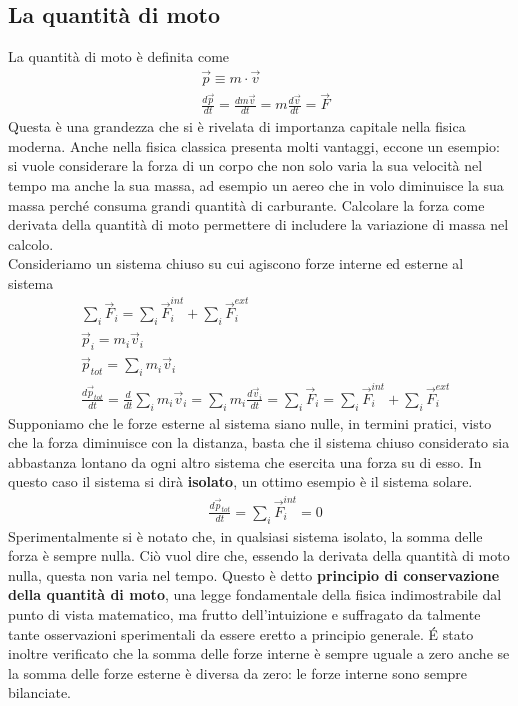 \subsection{La quantità di moto}
La quantità di moto è definita come
\begin{align*}
&\vec{p} \equiv m \cdot \vec{v}\\
&\frac{d\vec{p}}{dt} = \frac{d m\vec{v}}{dt} = m\frac{d\vec{v}}{dt}= \vec{F}
\end{align*}
Questa è una grandezza che si è rivelata di importanza capitale nella fisica moderna. Anche nella fisica classica presenta molti vantaggi, eccone un esempio: si vuole considerare la forza di un corpo che non solo varia la sua velocità nel tempo ma anche la sua massa, ad esempio un aereo che in volo diminuisce la sua massa perché consuma grandi quantità di carburante. Calcolare la forza come derivata della quantità di moto permettere di includere la variazione di massa nel calcolo.\\
Consideriamo un sistema chiuso su cui agiscono forze interne ed esterne al sistema
\begin{align*}
&\sum_{i}\vec{F}_i= \sum_{i}\vec{F}_i^{int}+ \sum_{i}\vec{F}_i^{ext}\\
&\vec{p}_i=m_i\vec{v}_i\\
&\vec{p}_{tot}=\sum_{i}m_i\vec{v}_i\\
&\frac{d\vec{p}_{tot}}{dt}=\frac{d}{dt}\sum_{i}m_i\vec{v}_i=\sum_{i}m_i\frac{d\vec{v}_i}{dt}=\sum_{i}\vec{F}_i= \sum_{i}\vec{F}_i^{int}+ \sum_{i}\vec{F}_i^{ext}
\end{align*}
Supponiamo che le forze esterne al sistema siano nulle, in termini pratici, visto che la forza diminuisce con la distanza, basta che il sistema chiuso considerato sia abbastanza lontano da ogni altro sistema che esercita una forza su di esso. In questo caso il sistema si dirà \textbf{isolato}, un ottimo esempio è il sistema solare.
\begin{align*}
	&\frac{d\vec{p}_{tot}}{dt}=\sum_{i}\vec{F}_i^{int}= 0
\end{align*}
Sperimentalmente si è notato che, in qualsiasi sistema isolato, la somma delle forza è sempre nulla. Ciò vuol dire che,
essendo la derivata della quantità di moto nulla, questa non varia nel tempo. Questo è detto \textbf{principio di conservazione della quantità di moto}, una legge fondamentale della fisica indimostrabile dal punto di vista matematico, ma frutto dell'intuizione e suffragato da talmente tante osservazioni sperimentali da essere eretto a principio generale. \'{E} stato inoltre verificato che la somma delle forze interne è sempre uguale a zero anche se la somma delle forze esterne è diversa da zero: le forze interne sono sempre bilanciate.  
